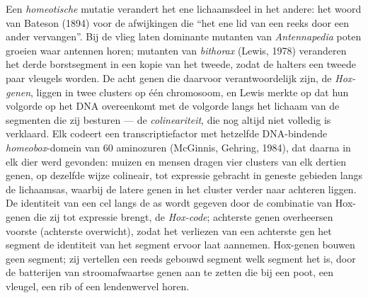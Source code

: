 \begin{definition}\label{def:b3:developmental-genetics:hox}
Een \emph{homeotische} mutatie verandert het ene lichaamsdeel in het
andere: het woord van Bateson (1894) voor de afwijkingen die ``het ene
lid van een reeks door een ander vervangen''. Bij de vlieg laten
dominante mutanten van \emph{Antennapedia} poten groeien waar antennen
horen; mutanten van \emph{bithorax} (Lewis, 1978) veranderen het derde
borstsegment in een kopie van het tweede, zodat de halters een tweede
paar vleugels worden. De acht genen die daarvoor verantwoordelijk zijn,
de \emph{Hox-genen}, liggen in twee clusters op één chromosoom, en
Lewis merkte op dat hun volgorde op het DNA overeenkomt met de volgorde
langs het lichaam van de segmenten die zij besturen --- de
\emph{colineariteit}, die nog altijd niet volledig is verklaard. Elk
codeert een transcriptiefactor met hetzelfde DNA-bindende
\emph{homeobox}-domein van 60 aminozuren (McGinnis, Gehring, 1984), dat
daarna in elk dier werd gevonden: muizen en mensen dragen vier clusters
van elk dertien genen, op dezelfde wijze colineair, tot expressie
gebracht in geneste gebieden langs de lichaamsas, waarbij de latere
genen in het cluster verder naar achteren liggen. De identiteit van een
cel langs de as wordt gegeven door de combinatie van Hox-genen die zij
tot expressie brengt, de \emph{Hox-code}; achterste genen overheersen
voorste (achterste overwicht), zodat het verliezen van een achterste
gen het segment de identiteit van het segment ervoor laat aannemen.
Hox-genen bouwen geen segment; zij vertellen een reeds gebouwd segment
welk segment het is, door de batterijen van stroomafwaartse genen aan
te zetten die bij een poot, een vleugel, een rib of een lendenwervel
horen.
\end{definition}

